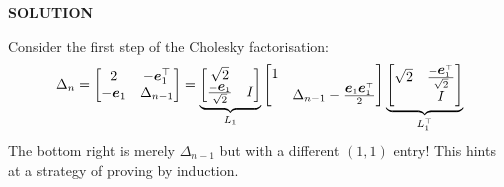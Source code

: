 \documentclass[12pt,a4paper]{article}
\def\e{ {\vc e} }
\begin{document}
\textbf{SOLUTION}

Consider the first step of the Cholesky factorisation:
\[
\ensuremath{\Delta}_n = \begin{bmatrix} 2 & -\ensuremath{\bm{\e}}_1^\ensuremath{\top} \\
                    -\ensuremath{\bm{\e}}_1 & \ensuremath{\Delta}_{n-1} \end{bmatrix} =
                    \underbrace{\begin{bmatrix} \sqrt{2} \\
                                    {-\ensuremath{\bm{\e}}_1 \over \sqrt{2}} & I
                                        \end{bmatrix}}_{L_1}
                    \begin{bmatrix}1 \\ & \ensuremath{\Delta}_{n-1} - {\ensuremath{\bm{\e}}_1 \ensuremath{\bm{\e}}_1^\ensuremath{\top} \over 2} \end{bmatrix}
                    \underbrace{\begin{bmatrix} \sqrt{2} & {-\ensuremath{\bm{\e}}_1^\ensuremath{\top} \over \sqrt{2}} \\
                                                            & I
                                        \end{bmatrix}}_{L_1^\ensuremath{\top}}
\]
The bottom right is merely $\ensuremath{\Delta}_{n-1}$ but with a different $(1,1)$ entry! This hints at a strategy of proving by induction.
\end{document}
